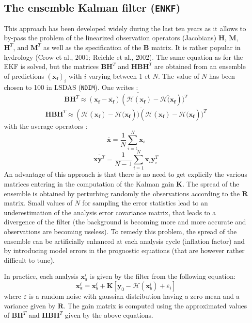 \documentclass[12pt]{article}
\begin{document}
\subsection{The ensemble Kalman filter ({\tt ENKF})}
This approach has been developed widely during the last ten years
as it allows to by-pass the problem of the linearized observation
operators (Jacobians)
 $\mathbf{H}$, $\mathbf{M}$, $\mathbf{H}^T$, and
$\mathbf{M}^T$ 
as well as the specification of the 
$\mathbf{B}$ matrix. It is rather popular in hydrology (Crow et al., 2001; Reichle et al., 2002).
The same equation as for the EKF is solved, but the matrices
  $\mathbf{BH}^T$ and 
$\mathbf{HBH}^T$  are  obtained from an ensemble of predictions
$(\mathbf{x_f})_i$ with $i$ varying between 1 et $N$. The value of $N$
has been chosen to 100 in LSDAS ({\tt NDIM}). One writes :
\[
\mathbf{BH}^T  \approx 
\overline{(\mathbf{x_f}-\overline{\mathbf{x_f}})
(\mathcal{H}(\mathbf{x_f}) - \overline{\mathcal{H}(\mathbf{x_f}}))^T}
\]
\[
\mathbf{HBH}^T  \approx 
\overline{(\mathcal{H}(\mathbf{x_f})-\overline{\mathcal{H}(\mathbf{x_f}}))
(\mathcal{H}(\mathbf{x_f}) - \overline{\mathcal{H}(\mathbf{x_f}}))^T}
\]
with the average operators : 
\[
\overline{\mathbf{x}}= \frac{1}{N}\sum_{i=1}^N \mathbf{x}_i
\]
\[
\overline{\mathbf{x}\mathbf{y}^T}= \frac{1}{N-1} \sum_{i=1}^N
\mathbf{x}_i
\mathbf{y}^T_i
\]
An advantage of this approach is that there is no need to get explicily
the various matrices entering in the computation of the Kalman gain 
$\mathbf{K}$. 
The spread of the ensemble is obtained by perturbing randomly the observations
according to the $\mathbf{R}$ matrix. Small values of $N$ for sampling the
error statistics lead to an underestimation of the analysis error
covariance matrix, that leads to a divergence of the filter (the background
is becoming more and more accurate and observations are becoming useless).
To remedy this problem, the spread of the ensemble can be artificially enhanced
at each analysis cycle (inflation factor) and by introducing model errors in
the prognostic equations (that are however rather difficult to tune).
\par
In practice, each analysis $\mathbf{x}_a^i$  is given by the filter from
the following equation:
\[
\mathbf{x}_a^{i} = \mathbf{x}_b^{i} + \mathbf{K}[
\mathbf{y}_0 - \mathcal{H}(\mathbf{x}_b^i) + \varepsilon_i] 
\]
where $\varepsilon$ is a random noise with gaussian distribution having a zero mean
and a variance given by $\mathbf{R}$. The gain matrix is computed using
the approximated values of $\mathbf{BH}^T$ and $\mathbf{HBH}^T$ given by the above equations.
\end{document}
